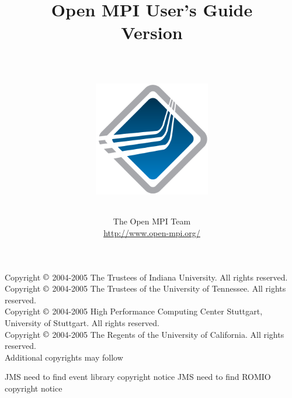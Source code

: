 %
% 
% 
%

\title{Open MPI User's Guide \\
Version \ompiversion \\
\ \\
\centerline{\includegraphics[width=2in]{openmpi_logo-only}}}

\author{The Open MPI Team \\
\url{http://www.open-mpi.org/}}

\maketitle

\thispagestyle{empty}

\newpage

\vspace*{6in}

\noindent 
Copyright $\copyright$ 2004-2005 The Trustees of Indiana University.
All rights reserved. \\
Copyright $\copyright$ 2004-2005 The Trustees of the University of
Tennessee.
All rights reserved. \\
Copyright $\copyright$ 2004-2005 High Performance Computing Center
Stuttgart, University of Stuttgart.  All rights
reserved. \\
Copyright $\copyright$ 2004-2005 The Regents of the University of
California.
All rights reserved. \\

Additional copyrights may follow

{\Huge JMS need to find event library copyright notice}
{\Huge JMS need to find ROMIO copyright notice}
